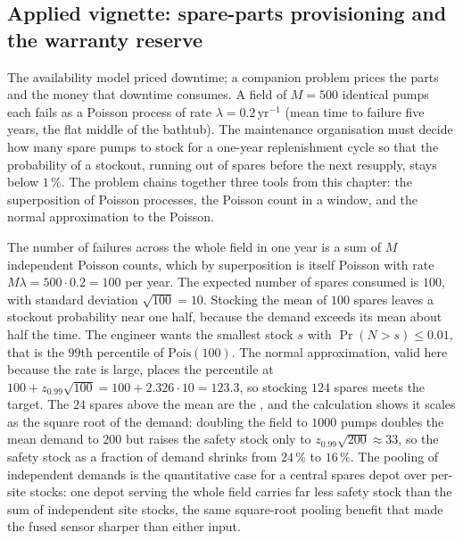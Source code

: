 \subsection{Applied vignette: spare-parts provisioning and the warranty
reserve}

The availability model priced downtime; a companion problem prices the
parts and the money that downtime consumes. A field of $M = 500$
identical pumps each fails as a Poisson process of rate $\lambda =
0.2\,\text{yr}^{-1}$ (mean time to failure five years, the flat middle of
the bathtub). The maintenance organisation must decide how many spare
pumps to stock for a one-year replenishment cycle so that the probability
of a stockout, running out of spares before the next resupply, stays
below $1\,\%$. The problem chains together three tools from this chapter:
the superposition of Poisson processes, the Poisson count in a window,
and the normal approximation to the Poisson.

The number of failures across the whole field in one year is a sum of
$M$ independent Poisson counts, which by superposition is itself Poisson
with rate $M\lambda = 500 \cdot 0.2 = 100$ per year. The expected number
of spares consumed is $100$, with standard deviation $\sqrt{100} = 10$.
Stocking the mean of $100$ spares leaves a stockout probability near
one half, because the demand exceeds its mean about half the time. The
engineer wants the smallest stock $s$ with $\Pr(N > s) \leq 0.01$, that
is the $99$th percentile of $\mathrm{Pois}(100)$. The normal
approximation, valid here because the rate is large, places the
percentile at $100 + z_{0.99}\sqrt{100} = 100 + 2.326 \cdot 10 = 123.3$,
so stocking $124$ spares meets the target. The $24$ spares above the mean
are the , and the calculation shows it scales as
the square root of the demand: doubling the field to $1000$ pumps doubles
the mean demand to $200$ but raises the safety stock only to $z_{0.99}
\sqrt{200} \approx 33$, so the safety stock as a fraction of demand
shrinks from $24\,\%$ to $16\,\%$. The pooling of independent demands is
the quantitative case for a central spares depot over per-site stocks:
one depot serving the whole field carries far less safety stock than the
sum of independent site stocks, the same square-root pooling benefit that
made the fused sensor sharper than either input.

